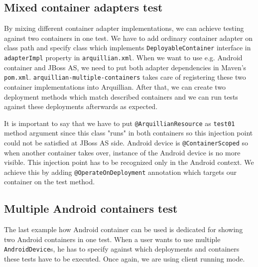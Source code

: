 \documentclass[12pt,final,oneside]{fithesis}
\begin{document}


		\subsection{Mixed container adapters test}

By mixing different container adapter implementations, we can achieve testing against two containers in one test. We have to add ordinary container adapter on class path and specify class which implements \texttt{DeployableContainer} interface in \texttt{adapterImpl} property in \linebreak \texttt{arquillian.xml}. When we want to use e.g. Android container and JBoss AS, we need to put both adapter dependencies in Maven's \texttt{pom.xml}. \texttt{arquillian\--multiple-containers} takes care of registering these two container implementations into Arquillian. After that, we can create two deployment methods which match described containers and we can run tests against these deployments afterwards as expected.


	
It is important to say that we have to put \texttt{@ArquillianResource} as \texttt{test01} method argument since this class "runs" in both containers so this injection point could not be satisfied at JBoss AS side. Android device is \texttt{@ContainerScoped} so when another container takes over, instance of the Android device is no more visible. This injection point has to be recognized only in the Android context. We achieve this by adding \texttt{@OperateOnDeployment} annotation which targets our container on the test method.

		\subsection{Multiple Android containers test}

The last example how Android container can be used is dedicated for showing two Android containers in one test. When a user wants to use multiple \texttt{AndroidDevice}s, he has to specify against which deployments and containers these tests have to be executed. Once again, we are using client running mode.  


\end{document}

